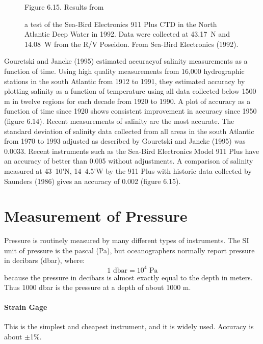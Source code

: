 \begin{figure}[b!]
\vspace{-4ex}
\footnotesize
Figure 6.15. Results from \rule{0pt}{3ex}a test of the Sea-Bird Electronics 911
Plus CTD in the North Atlantic Deep Water in 1992. Data were collected at
43.17\degrees\ N and 14.08\degrees\ W from the R/V Poseidon. From Sea-Bird
Electronics (1992).
\label{fig:911data}
\end{figure}

Gouretski and Jancke (1995) estimated accuracyof salinity measurements as a function of time. Using high quality measurements from 16,000 hydrographic stations in the south Atlantic from 1912 to 1991, they estimated accuracy by plotting salinity as a function of temperature using all data collected below 1500 m in twelve regions for each decade from 1920 to 1990. A plot of accuracy as a function of time since 1920 shows consistent improvement in accuracy since 1950 (figure 6.14). Recent measurements of salinity are the most accurate. The standard deviation of salinity data collected from all areas in the south Atlantic from 1970 to 1993 adjusted as described by Gouretski and Jancke (1995) was 0.0033. Recent instruments such as the Sea-Bird Electronics Model 911 Plus have an accuracy of better than 0.005 without adjustments. A comparison of salinity measured at 43\degrees\ 10\'{}N, 14\degrees\ 4.5\'{}W
by the 911 Plus with historic data collected by Saunders (1986) gives an accuracy of 0.002 (figure 6.15).

\section{Measurement of Pressure}
Pressure is routinely measured by
many different types of instruments. The SI unit of pressure is
the pascal (Pa), but oceanographers normally report pressure in
decibars (dbar), where:
\begin{equation}
1 \text{ dbar} = 10^4 \text{ Pa}
\end{equation}
because the pressure in decibars is almost exactly equal to the depth in meters.
Thus 1000 dbar is the pressure at a depth of about 1000 m.

\paragraph{Strain Gage}This is the simplest and
cheapest instrument,
and it is widely used. Accuracy is about
$\pm$1\%.

